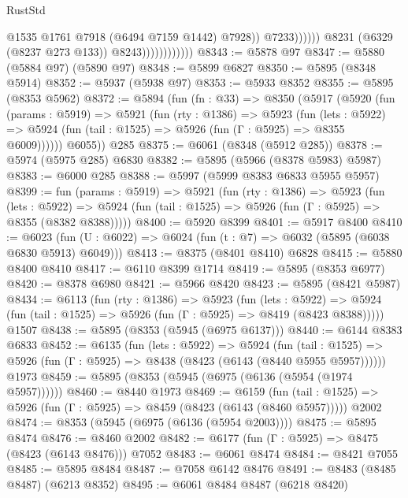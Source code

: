 \begin{lexlean}{RustStd}
\begin{coremodule}
{\begin{coremodule}
{{{{{{{{{{{{{{{{{{{{{{{{{{{{{{{{{{{                                            @1535
                                            @1761
                                            @7918
                                            (@6494 @7159 @1442)
                                            @7928))
                                        @7233))))))
                            @8231
                            (@6329 (@8237 @273 @133))
                            @8243))))))))))))
@8343 := @5878 @97
@8347 := @5880 (@5884 @97) (@5890 @97)
@8348 := @5899 @6827
@8350 := @5895 (@8348 @5914)
@8352 := @5937 (@5938 @97)
@8353 := @5933 @8352
@8355 := @5895 (@8353 @5962)
@8372 := @5894
    (fun (fn : @33) =>
    @8350
      (@5917
        (@5920
          (fun (params : @5919) =>
          @5921
            (fun (rty : @1386) =>
            @5923
              (fun (lets : @5922) =>
              @5924 (fun (tail : @1525) => @5926 (fun (Γ : @5925) => @8355 @6009))))))
        @6055))
    @285
@8375 := @6061 (@8348 (@5912 @285))
@8378 := @5974 (@5975 @285) @6830
@8382 := @5895 (@5966 (@8378 @5983) @5987)
@8383 := @6000 @285
@8388 := @5997 (@5999 @8383 @6833 @5955 @5957)
@8399 := fun (params : @5919) =>
  @5921
    (fun (rty : @1386) =>
    @5923
      (fun (lets : @5922) =>
      @5924 (fun (tail : @1525) => @5926 (fun (Γ : @5925) => @8355 (@8382 @8388)))))
@8400 := @5920 @8399
@8401 := @5917 @8400
@8410 := @6023 (fun (U : @6022) => @6024 (fun (t : @7) => @6032 (@5895 (@6038 @6830 @5913) @6049)))
@8413 := @8375 (@8401 @8410) @6828
@8415 := @5880 @8400 @8410
@8417 := @6110 @8399 @1714
@8419 := @5895 (@8353 @6977)
@8420 := @8378 @6980
@8421 := @5966 @8420
@8423 := @5895 (@8421 @5987)
@8434 := @6113
    (fun (rty : @1386) =>
    @5923
      (fun (lets : @5922) =>
      @5924 (fun (tail : @1525) => @5926 (fun (Γ : @5925) => @8419 (@8423 @8388)))))
    @1507
@8438 := @5895 (@8353 (@5945 (@6975 @6137)))
@8440 := @6144 @8383 @6833
@8452 := @6135
    (fun (lets : @5922) =>
    @5924
      (fun (tail : @1525) => @5926 (fun (Γ : @5925) => @8438 (@8423 (@6143 (@8440 @5955 @5957))))))
    @1973
@8459 := @5895 (@8353 (@5945 (@6975 (@6136 (@5954 (@1974 @5957))))))
@8460 := @8440 @1973
@8469 := @6159
    (fun (tail : @1525) => @5926 (fun (Γ : @5925) => @8459 (@8423 (@6143 (@8460 @5957)))))
    @2002
@8474 := @8353 (@5945 (@6975 (@6136 (@5954 @2003))))
@8475 := @5895 @8474
@8476 := @8460 @2002
@8482 := @6177 (fun (Γ : @5925) => @8475 (@8423 (@6143 @8476))) @7052
@8483 := @6061 @8474
@8484 := @8421 @7055
@8485 := @5895 @8484
@8487 := @7058 @6142 @8476
@8491 := @8483 (@8485 @8487) (@6213 @8352)
@8495 := @6061 @8484 @8487 (@6218 @8420)
}}}}}}}}}}}}}}}}}}}}}}}}}}}}}}}}}}}
\end{coremodule}}
\end{coremodule}
\end{lexlean}
